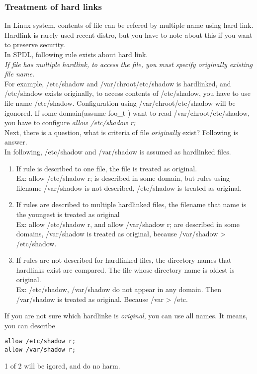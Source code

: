 \documentclass{article}
\begin{document}
\subsubsection{Treatment of hard links}
  In Linux system, contents of file can be refered by multiple name
       using hard link. Hardlink is rarely used recent distro, but you
       have to note about this if you want to preserve security.\\
       In SPDL, following rule exists about hard link.\\
       {\it If file has multiple hardlink, to access the file, you must
       specify originally existing file name.}\\
       For example, /etc/shadow and /var/chroot/etc/shadow is hardlinked,
       and /etc/shadow exists originally, to access contents of
       /etc/shadow, you have to use file name /etc/shadow. Configuration
       using /var/chroot/etc/shadow will be igonored. 
       If some domain(assume foo\_t ) want to read
       /var/chroot/etc/shadow, you have to configure {\it allow
       /etc/shadow r;}\\
       Next, there is a question, what is criteria of file {\it
       originally} exist? Following is answer.\\
       In following, /etc/shadow and /var/shadow is assumed as
       hardlinked files.
       \begin{enumerate}
	\item If rule is described to one file, the file is treated as
	      original.\\
	      Ex: allow /etc/shadow r; is described in some domain, but
	      rules using filename /var/shadow is not described,
	      /etc/shadow is treated as original.
	\item If rules are described to multiple hardlinked files, the
	      filename that name is the youngest is treated as
	      original\\
	      Ex: allow /etc/shadow r, and allow /var/shadow r; are
	      described in some domains, /var/shadow is treated as
	      original, because /var/shadow > /etc/shadow.
	\item If rules are not described for hardlinked files, the
	      directory names that hardlinks exist are compared. The
	      file whose directory  name is oldest  is original.\\
	      Ex: /etc/shadow, /var/shadow do not appear in any domain.
	      Then /var/shadow is treated as original. Because
	      /var > /etc.
       \end{enumerate}
       If you are not sure which hardlinke is {\it original}, you can
       use all names. It means, you can describe
\begin{verbatim}
allow /etc/shadow r;
allow /var/shadow r;
\end{verbatim}
1 of 2 will be igored, and do no harm.
  
\end{document}
